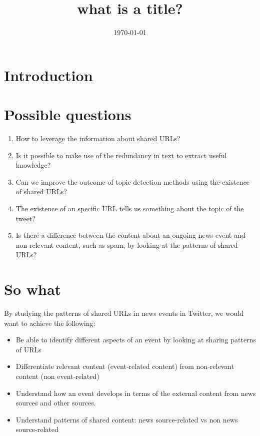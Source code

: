 \documentclass{article}
\title{what is a title?}
\date{\today}
\begin{document}
\maketitle

\section{Introduction}

\section{Possible questions}

\begin{enumerate}
\item How to leverage the information about shared URLs?
\item Is it possible to make use of the redundancy in text to extract
  useful knowledge?
\item Can we improve the outcome of topic detection methods using the
  existence of shared URLs?
\item The existence of an specific URL tells us something about the
  topic of the tweet?
\item Is there a difference between the content about an ongoing news
  event and non-relevant content, such as spam, by looking at the
  patterns of shared URLs?

\end{enumerate}

\section{So what}

By studying the patterns of shared URLs in news events in Twitter, we
would want to achieve the following:

\begin{itemize}
\item Be able to identify different aspects of an event by looking at
  sharing patterns of URLs
\item Differentiate relevant content (event-related content) from
  non-relevant content (non event-related)
\item Understand how an event develops in terms of the external
  content from news sources and other sources.
\item Understand patterns of shared content: news source-related vs
  non news source-related
\end{itemize}
\end{document}
